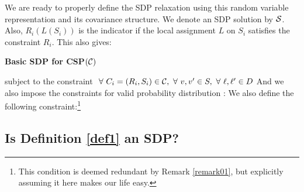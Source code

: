 We are ready to properly define the SDP relaxation using this random variable representation and its covariance structure.  
We denote an SDP solution by $\mathcal{S}$. Also, $R_i(L(S_i))$ is the indicator if the local assignment $L$ on $S_i$ satisfies the constraint $R_i$. This also gives: 
\begin{definition}{\label{def1}}
{\bf Basic SDP for CSP$(\mathcal{C})$}  

subject to the constraint $\ \forall \  C_i = (R_i, S_i) \in \mathcal{C},\ \forall \  v, v' \in S, \ \forall \  \ell, \ell' \in D $
And we also impose the constraints for valid probability distribution : 
We also define the following constraint:\footnote{This condition is deemed redundant by Remark \ref{remark01}, but explicitly assuming it here makes our life easy.} 
\end{definition}

\subsection{Is Definition \ref{def1} an SDP?}


